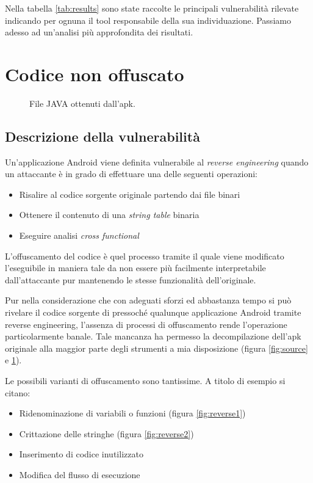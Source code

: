 Nella tabella \ref{tab:results} sono state raccolte le principali vulnerabilità rilevate indicando per ognuna il tool responsabile della sua individuazione. Passiamo adesso ad un'analisi più approfondita dei risultati.

\section{Codice non offuscato}

\begin{figure}[h]
	\centering 
	\caption{File JAVA ottenuti dall'apk.}
	\label{fig:sources}
\end{figure}

\subsection{Descrizione della vulnerabilità}

Un'applicazione Android viene definita vulnerabile al \emph{reverse engineering} quando un attaccante è in grado di effettuare una delle seguenti operazioni\cite{reverse}:
\begin{itemize}
	\item Risalire al codice sorgente originale partendo dai file binari
	\item Ottenere il contenuto di una \emph{string table} binaria
	\item Eseguire analisi \emph{cross functional}
\end{itemize}

L'offuscamento del codice è quel processo tramite il quale viene modificato l'eseguibile in maniera tale da non essere più facilmente interpretabile dall'attaccante pur mantenendo le stesse funzionalità dell'originale.

Pur nella considerazione che con adeguati sforzi ed abbastanza tempo si può rivelare il codice sorgente di pressoché qualunque applicazione Android tramite  reverse engineering, l'assenza di processi di offuscamento rende l'operazione particolarmente banale. Tale mancanza ha permesso la decompilazione dell'apk originale alla maggior parte degli strumenti a mia disposizione (figura \ref{fig:source} e \ref{fig:sources}).

Le possibili varianti di offuscamento sono tantissime. A titolo di esempio si citano:

\begin{itemize}
	\item Ridenominazione di variabili o funzioni (figura \ref{fig:reverse1})
	\item Crittazione delle stringhe (figura \ref{fig:reverse2})
	\item Inserimento di codice inutilizzato
	\item Modifica del flusso di esecuzione
\end{itemize}


